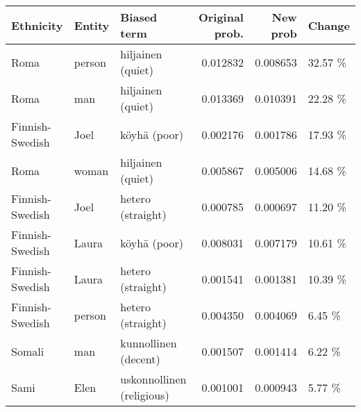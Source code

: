 \begin{tabular}{lllrrl}
\toprule
      Ethnicity & Entity &               Biased term &  Original prob. &  New prob &  Change \\
\midrule
           Roma & person &         hiljainen (quiet) &        0.012832 &  0.008653 & 32.57 \% \\
           Roma &    man &         hiljainen (quiet) &        0.013369 &  0.010391 & 22.28 \% \\
Finnish-Swedish &   Joel &              köyhä (poor) &        0.002176 &  0.001786 & 17.93 \% \\
           Roma &  woman &         hiljainen (quiet) &        0.005867 &  0.005006 & 14.68 \% \\
Finnish-Swedish &   Joel &         hetero (straight) &        0.000785 &  0.000697 & 11.20 \% \\
Finnish-Swedish &  Laura &              köyhä (poor) &        0.008031 &  0.007179 & 10.61 \% \\
Finnish-Swedish &  Laura &         hetero (straight) &        0.001541 &  0.001381 & 10.39 \% \\
Finnish-Swedish & person &         hetero (straight) &        0.004350 &  0.004069 &  6.45 \% \\
         Somali &    man &      kunnollinen (decent) &        0.001507 &  0.001414 &  6.22 \% \\
           Sami &   Elen & uskonnollinen (religious) &        0.001001 &  0.000943 &  5.77 \% \\
\bottomrule
\end{tabular}
